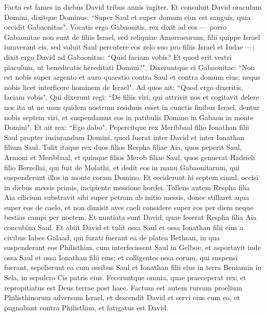 \begin{biblechapter}  
\verse Facta est fames in diebus David tribus annis iugiter. Et consuluit David oraculum Domini, dixitque Dominus: “Super Saul et super domum eius est sanguis, quia occidit Gabaonitas". 
\verse Vocatis ergo Gabaonitis, rex dixit ad eos — porro Gabaonitae non sunt de filiis Israel, sed reliquiae Amorraeorum; filii quippe Israel iuraverant eis, sed voluit Saul percutere eos zelo suo pro filiis Israel et Iudae —; 
\verse dixit ergo David ad Gabaonitas: “Quid faciam vobis? Et quod erit vestri piaculum, ut benedicatis hereditati Domini?". 
\verse Dixeruntque ei Gabaonitae: “Non est nobis super argento et auro quaestio contra Saul et contra domum eius; neque nobis licet interficere hominem de Israel". Ad quos ait: “Quod ergo dixeritis, faciam vobis". 
\verse Qui dixerunt regi: “De filiis viri, qui attrivit nos et cogitavit delere nos ita ut ne unus quidem nostrum residuus esset in cunctis finibus Israel, 
\verse dentur nobis septem viri, et suspendamus eos in patibulis Domino in Gabaon in monte Domini". Et ait rex: “Ego dabo". 
\verse Pepercitque rex Meribbaal filio Ionathan filii Saul propter iusiurandum Domini, quod fuerat inter David et inter Ionathan filium Saul. 
\verse Tulit itaque rex duos filios Respha filiae Aia, quos peperit Saul, Armoni et Meribbaal, et quinque filios Merob filiae Saul, quos genuerat Hadrieli filio Berzellai, qui fuit de Molathi, 
\verse et dedit eos in manu Gabaonitarum, qui suspenderunt illos in monte coram Domino. Et ceciderunt hi septem simul, occisi in diebus messis primis, incipiente messione hordei. 
\verse Tollens autem Respha filia Aia cilicium substravit sibi super petram ab initio messis, donec stillaret aqua super eos de caelo, et non dimisit aves caeli considere super eos per diem neque bestias campi per noctem. 
\verse Et nuntiata sunt David, quae fecerat Respha filia Aia concubina Saul. 
\verse Et abiit David et tulit ossa Saul et ossa Ionathan filii eius a civibus Iabes Galaad, qui furati fuerant ea de platea Bethsan, in qua suspenderant eos Philisthim, cum interfecissent Saul in Gelboe, 
\verse et asportavit inde ossa Saul et ossa Ionathan filii eius; et colligentes ossa eorum, qui suspensi fuerant, 
\verse sepelierunt ea cum ossibus Saul et Ionathan filii eius in terra Beniamin in Sela, in sepulcro Cis patris eius. Feceruntque omnia, quae praeceperat rex; et repropitiatus est Deus terrae post haec. 
\verse Factum est autem rursum proelium Philisthinorum adversum Israel, et descendit David et servi eius cum eo, et pugnabant contra Philisthim, et fatigatus est David. 

\end{biblechapter}
